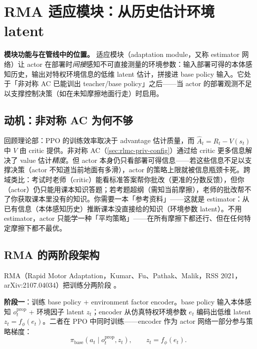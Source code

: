 \section{RMA 适应模块：从历史估计环境 latent}
\label{sec:rlmc-priv-estimator}

\textbf{模块功能与在管线中的位置。} 适应模块（adaptation module，又称 estimator 网络）让 actor 在部署时\emph{间接}感知不可直接测量的环境参数：输入部署可得的本体感知历史，输出对特权环境信息的低维 latent 估计，拼接进 base policy 输入。它处于「非对称 AC 已能训出 teacher/base policy」之后——当 actor 的部署观测不足以支撑控制决策（如在未知摩擦地面行走）时启用。

\subsection{动机：非对称 AC 为何不够}
\label{sec:rlmc-priv-whyestimator}

回顾理论部：PPO 的训练效率取决于 advantage 估计质量，而 $\hat A_t=R_t-V(s_t)$ 中 $V$ 由 critic 提供。非对称 AC（\cref{sec:rlmc-priv-config}）通过给 critic 更多信息解决了 value 估计\emph{精度}。但 actor 本身仍只看部署可得信息——若这些信息不足以支撑决策（actor 不知道当前地面有多滑），actor 的策略上限就被信息瓶颈卡死。跨域类比：考试时老师（critic）能看标准答案帮你批改（更准的分数反馈），但你（actor）仍只能用课本知识答题；若考题超纲（需知当前摩擦），老师的批改帮不了你获取课本里没有的知识。你需要一本「参考资料」——这就是 estimator：从已有信息（本体感知历史）推断课本没直接给的知识（环境参数 latent）。不用 estimator，actor 只能学一种「平均策略」——在所有摩擦下都还行、但在任何特定摩擦下都不最优。

\subsection{RMA 的两阶段架构}
\label{sec:rlmc-priv-rma2}

RMA（Rapid Motor Adaptation，Kumar、Fu、Pathak、Malik，RSS 2021，arXiv:2107.04034）把训练分两阶段 \cite{kumar2021rma}。

\textbf{阶段一}：训练 base policy + environment factor encoder。base policy 输入本体感知 $o_t^{\text{prop}}$ + 环境因子 latent $z_t$；encoder 从仿真特权环境参数 $e_t$ 编码出低维 latent $z_t=f_\phi(e_t)$。二者在 PPO 中同时训练——encoder 作为 actor 网络一部分参与策略梯度：
\begin{equation}
\pi_{\text{base}}(a_t \mid o_t^{\text{prop}}, z_t), \qquad z_t = f_\phi(e_t).
\label{eq:rlmc-priv-rma-base}
\end{equation}

